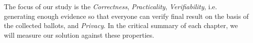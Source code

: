   
 
% 


The focus of our study is the \textit{Correctness}, 
 \textit{Practicality}, \textit{Verifiability}, i.e. generating enough evidence so that 
 everyone can verify final result on the basis of the collected ballots, and \textit{Privacy}. In the critical 
 summary of each chapter, we will measure our solution against these properties. 
 
 
%


	      
%  
  
       
%  
%  
%  
%  
    
